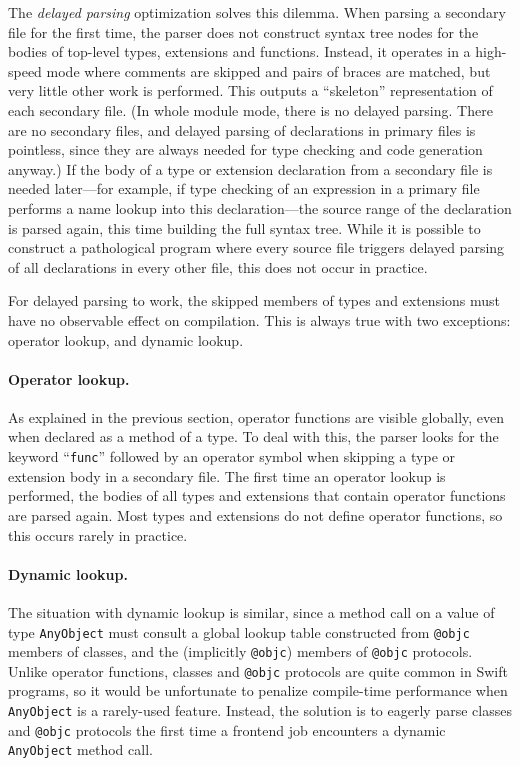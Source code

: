 \documentclass[../generics]{subfiles}
\begin{document}
The \emph{delayed parsing} optimization solves this dilemma. When parsing a secondary file for the first time, the parser does not construct syntax tree nodes for the bodies of top-level types, extensions and functions. Instead, it operates in a high-speed mode where comments are skipped and pairs of braces are matched, but very little other work is performed. This outputs a ``skeleton'' representation of each secondary file. (In whole module mode, there is no delayed parsing. There are no secondary files, and delayed parsing of declarations in primary files is pointless, since they are always needed for type checking and code generation anyway.) If the body of a type or extension declaration from a secondary file is needed later---for example, if type checking of an expression in a primary file performs a name lookup into this declaration---the source range of the declaration is parsed again, this time building the full syntax tree. While it is possible to construct a pathological program where every source file triggers delayed parsing of all declarations in every other file, this does not occur in practice.

For delayed parsing to work, the skipped members of types and extensions must have no observable effect on compilation. This is always true with two exceptions: operator lookup, and dynamic lookup.

\paragraph{Operator lookup.}
As explained in the previous section, operator functions are visible globally, even when declared as a method of a type. To deal with this, the parser looks for the keyword ``\texttt{func}'' followed by an operator symbol when skipping a type or extension body in a secondary file. The first time an operator lookup is performed, the bodies of all types and extensions that contain operator functions are parsed again. Most types and extensions do not define operator functions, so this occurs rarely in practice.

\paragraph{Dynamic  lookup.}
The situation with dynamic lookup is similar, since a method call on a value of type \texttt{AnyObject} must consult a global lookup table constructed from \texttt{@objc} members of classes, and the (implicitly \texttt{@objc}) members of \texttt{@objc} protocols.  Unlike operator functions, classes and \texttt{@objc} protocols are quite common in Swift programs, so it would be unfortunate to penalize compile-time performance when \texttt{AnyObject} is a rarely-used feature. Instead, the solution is to eagerly parse classes and \texttt{@objc} protocols the first time a frontend job encounters a dynamic \texttt{AnyObject} method call.
\end{document}
